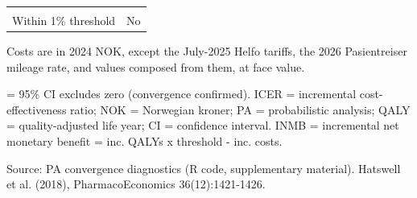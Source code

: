 \begin{table}[H]
{\begin{threeparttable}
\begin{tabular}[t]{lr}
\cellcolor[HTML]{F7F9FC}{\textcolor[HTML]{2D3748}{Percentage difference}} & \cellcolor[HTML]{F7F9FC}{\textcolor[HTML]{2D3748}{4.14\%}}\\
\textcolor[HTML]{2D3748}{Within 1\% threshold} & \textcolor[HTML]{2D3748}{No}\\
\bottomrule
\end{tabular}
\begin{tablenotes}
\item Costs are in 2024 NOK, except the July-2025 Helfo tariffs, the 2026 Pasientreiser mileage rate, and values composed from them, at face value.
\item * = 95\% CI excludes zero (convergence confirmed). ICER = incremental cost-effectiveness ratio; NOK = Norwegian kroner; PA = probabilistic analysis; QALY = quality-adjusted life year; CI = confidence interval. INMB = incremental net monetary benefit = inc. QALYs x threshold - inc. costs.
\item Source: PA convergence diagnostics (R code, supplementary material). Hatswell et al. (2018), PharmacoEconomics 36(12):1421-1426.
\end{tablenotes}
\end{threeparttable}
}
\end{table}
